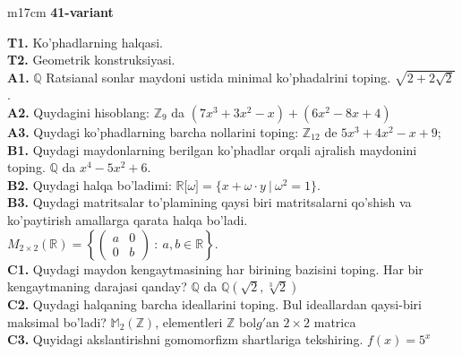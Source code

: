 \documentclass{article}
\begin{document}
\begin{tabular}{m{17cm}}
\textbf{41-variant}
\newline

\textbf{T1.} Ko'phadlarning halqasi. \\
\textbf{T2.} Geometrik konstruksiyasi. \\
\textbf{A1.} \(\mathbb{Q}\) Ratsianal sonlar maydoni ustida minimal ko'phadalrini toping.
\(\sqrt{2 + 2\sqrt{2}}\). \\
\textbf{A2.} Quydagini hisoblang:
\(\mathbb{Z}_{9}\) da \(\left( 7x^{3} + 3x^{2} - x \right) + \left( 6x^{2} - 8x + 4 \right)\) \\
\textbf{A3.} Quydagi ko'phadlarning barcha nollarini toping:
\(\mathbb{Z}_{12}\) de \(5x^{3} + 4x^{2} - x + 9\); \\
\textbf{B1.} Quydagi maydonlarning berilgan ko'phadlar orqali ajralish maydonini toping.
\(\mathbb{Q}\) da \(x^{4} - 5x^{2} + 6\). \\
\textbf{B2.} Quydagi halqa bo'ladimi:
\(\mathbb{R\lbrack}\omega\rbrack = \{ x + \omega \cdot y\ |\ \omega^{2} = 1\}\). \\
\textbf{B3.} Quydagi matritsalar to'plamining qaysi biri matritsalarni qo'shish va ko'paytirish amallarga qarata halqa bo'ladi.
\(M_{2 \times 2}\mathbb{(R) =}\left\{ \begin{pmatrix}
a & 0 \\
0 & b
\end{pmatrix}\ :\ a,b \in \mathbb{R} \right\}\). \\
\textbf{C1.} Quydagi maydon kengaytmasining har birining bazisini toping. Har bir kengaytmaning darajasi qanday?
\(\mathbb{Q}\) da \(\mathbb{Q}\left( \sqrt{2},\sqrt[3]{2} \right)\) \\
\textbf{C2.} Quydagi halqaning barcha ideallarini toping. Bul ideallardan qaysi-biri maksimal bo'ladi?
\(\mathbb{M}_{2}\left( \mathbb{Z} \right)\), elementleri \(\mathbb{Z}\) bol\(g'\)an \(2 \times 2\) matrica \\
\textbf{C3.} Quyidagi akslantirishni gomomorfizm shartlariga tekshiring. \(f(x) = 5^{x}\) \\

\end{tabular}
\vspace{1cm}
\end{document}
